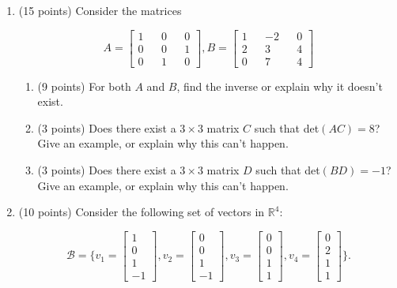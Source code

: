 \documentclass[12 pt]{report}
\begin{document}
\begin{enumerate}

\item (15 points) Consider the matrices 

\[
A = \begin{bmatrix} 1 && 0 && 0 \\ 0 && 0 && 1 \\ 0 && 1 && 0 \end{bmatrix}, B = \begin{bmatrix} 1 && -2 && 0  \\ 2 && 3 && 4 \\ 0 && 7 && 4 \end{bmatrix}
\]

\begin{enumerate} \item (9 points) For both $A$ and $B$, find the inverse or explain why it doesn't exist. 

\vspace{8cm}

\item (3 points) Does there exist a $3 \times 3$ matrix $C$ such that det$(AC) = 8$? Give an example, or explain why this can't happen. 

\vfill

\item (3 points) Does there exist a $3 \times 3$ matrix $D$ such that det$(BD) = -1$? Give an example, or explain why this can't happen. 

\vfill

\end{enumerate} 

\newpage

\item (10 points) Consider the following set of vectors in $\mathbb{R}^4$:

\[
\mathcal{B} = \Big\{ v_1 = \begin{bmatrix} 1 \\ 0 \\ 1 \\ -1 \end{bmatrix} ,  v_2 = \begin{bmatrix} 0 \\ 0 \\ 1 \\ -1 \end{bmatrix} , v_3 = \begin{bmatrix} 0 \\ 0 \\ 1 \\ 1 \end{bmatrix}, v_4 = \begin{bmatrix} 0 \\ 2 \\ 1 \\ 1 \end{bmatrix}  \Big\}.
\]


\end{enumerate}
\end{document}
